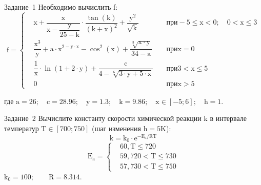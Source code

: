 \documentclass[aspectratio=169]{beamer}	%
\begin{document}
\begin{frame}[fragile]{Задание~1}
\large
Необходимо вычислить f:
\begin{equation*}
\mathrm{
f = \left\{ 
\begin{aligned}
	& x + \dfrac{x}{x - \dfrac{y}{25 - k}} \cdot \dfrac{\tan \left(k\right)}{\left(k + x\right)^2} + \dfrac{y^2}{\sqrt{k}} &\quad при -5 \leqslant x < 0; \quad 0 < x \leqslant 3 \\
	& \dfrac{x^3}{y} + a \cdot x ^ {2 - y \cdot x} - \cos^2\left(x\right) + \dfrac{\sqrt[3]{x \cdot y}}{34 - a} &\quad при x = 0 \\
	& \dfrac{1}{x} \cdot \ln \left(1 + 2 \cdot y\right) + \dfrac{c}{4 - \sqrt[6]{3 \cdot y + 5 \cdot x}} &\quad при 3 < x \leqslant 5 \\
	& 0 &\quad при x > 5
\end{aligned}	
\right.}
\end{equation*}

где \quad $\mathrm{a = 26; \quad c = 28.96; \quad y = 1.3; \quad k = 9.86; \quad x \in \left[-5; 6\right]; \quad h = 1}$.
\vfill
\end{frame}


\begin{frame}[fragile]{Задание~2}
\large
Вычислите константу скорости химической реакции k в интервале температур $\mathrm{T \in \left[700; 750\right]}$ (шаг изменения $\mathrm{h = 5 K}$):
\begin{equation*}
	\mathrm{k = k_0 \cdot e^{-E_a / RT}}
\end{equation*}
\begin{equation*}
\mathrm{
	E_a = \left\{
	\begin{aligned}
		& \mathrm{60, T \leqslant 720} \\
		& \mathrm{59, 720 < T \leqslant 730} \\
		& \mathrm{57, 730 < T \leqslant 750}
	\end{aligned}
	\right.}
\end{equation*}
$\mathrm{k_0 = 100; \qquad R = 8.314}$.
\vfill
\end{frame}
\end{document}
